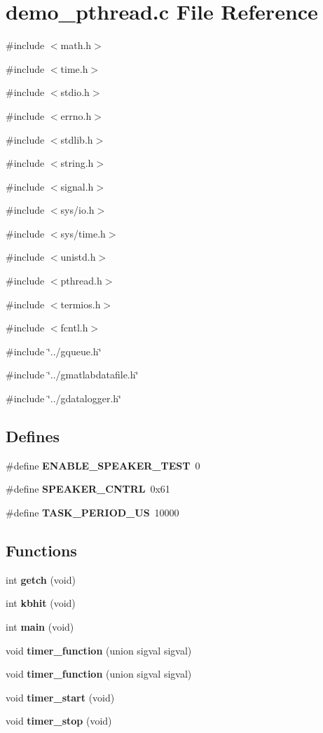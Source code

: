 \section{demo\_\-pthread.c File Reference}
\label{demo__pthread_8c}
{\ttfamily \#include $<$math.h$>$}\par
{\ttfamily \#include $<$time.h$>$}\par
{\ttfamily \#include $<$stdio.h$>$}\par
{\ttfamily \#include $<$errno.h$>$}\par
{\ttfamily \#include $<$stdlib.h$>$}\par
{\ttfamily \#include $<$string.h$>$}\par
{\ttfamily \#include $<$signal.h$>$}\par
{\ttfamily \#include $<$sys/io.h$>$}\par
{\ttfamily \#include $<$sys/time.h$>$}\par
{\ttfamily \#include $<$unistd.h$>$}\par
{\ttfamily \#include $<$pthread.h$>$}\par
{\ttfamily \#include $<$termios.h$>$}\par
{\ttfamily \#include $<$fcntl.h$>$}\par
{\ttfamily \#include \char`\"{}../gqueue.h\char`\"{}}\par
{\ttfamily \#include \char`\"{}../gmatlabdatafile.h\char`\"{}}\par
{\ttfamily \#include \char`\"{}../gdatalogger.h\char`\"{}}\par
\subsection*{Defines}
\begin{DoxyCompactItemize}
\item 
\#define {\bf ENABLE\_\-SPEAKER\_\-TEST}~0
\item 
\#define {\bf SPEAKER\_\-CNTRL}~0x61
\item 
\#define {\bf TASK\_\-PERIOD\_\-US}~10000
\end{DoxyCompactItemize}
\subsection*{Functions}
\begin{DoxyCompactItemize}
\item 
int {\bf getch} (void)
\item 
int {\bf kbhit} (void)
\item 
int {\bf main} (void)
\item 
void {\bf timer\_\-function} (union sigval sigval)
\item 
void {\bf timer\_\-function} (union sigval sigval)
\item 
void {\bf timer\_\-start} (void)
\item 
void {\bf timer\_\-stop} (void)
\end{DoxyCompactItemize}
